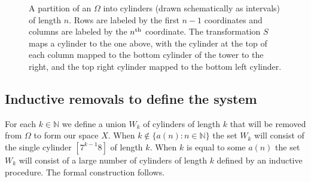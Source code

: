 \documentclass[AHL,Unicode,longabstracts,published]{cedram}
\newcommand{\N}{\mathbb{N}}
\begin{document}
\begin{figure}[!h]
\centering
{}

\caption{A partition of an $\Omega$ into cylinders (drawn schematically as intervals) of length $n$. Rows are labeled by the first $n - 1$ coordinates and columns are labeled by the $n^{\rm th}$ coordinate. The transformation $S$ maps a cylinder to the one above, with the cylinder at the top of each column mapped to the bottom cylinder of the tower to the right, and the top right cylinder mapped to the bottom left cylinder.}\label{fig:odometerTower}
\end{figure}


\subsection{Inductive removals to define the system}\label{subsec:removals}

For each $k \in \N$ we define a union $W_k$ of cylinders of length $k$ that will be removed from $\Omega$ to form our space $X$. When $k \notin \{ a(n) : n \in \N \}$ the set $W_k$ will consist of the single cylinder $[7^{k-1}8]$ of length $k$. When $k$ is equal to some $a(n)$ the set $W_k$ will consist of a large number of cylinders of length $k$ defined by an inductive procedure. The formal construction follows.
\end{document}

